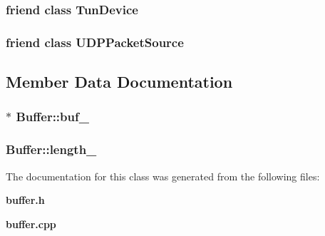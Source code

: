 \subsubsection{\setlength{\rightskip}{0pt plus 5cm}friend class {\bf Tun\-Device}\hspace{0.3cm}{\tt  [friend]}}\label{classBuffer_51b494563d277beb4740f86c519f30fb}


\subsubsection{\setlength{\rightskip}{0pt plus 5cm}friend class {\bf UDPPacket\-Source}\hspace{0.3cm}{\tt  [friend]}}\label{classBuffer_940a382a5e3a8622e6689e13dc453481}




\subsection{Member Data Documentation}
\subsubsection{$\ast$ {\bf Buffer::buf\_\-}\hspace{0.3cm}{\tt  [protected]}}\label{classBuffer_e60240b77a315e6b3c2bf88592d0be48}


\subsubsection{ {\bf Buffer::length\_\-}\hspace{0.3cm}{\tt  [protected]}}\label{classBuffer_d3a779d2403b5183427f12554e2f51c3}




The documentation for this class was generated from the following files:\begin{CompactItemize}
\item 
{\bf buffer.h}\item 
{\bf buffer.cpp}\end{CompactItemize}
